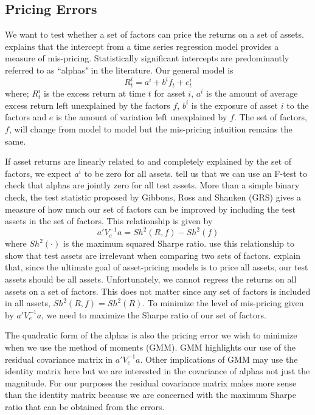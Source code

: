 
\subsection{Pricing Errors}

We want to test whether a set of factors can price the returns on a set of
assets.
\textcite{jensen1968performance} explains that the intercept from a time
series regression model provides a measure of mis-pricing.
Statistically significant intercepts are predominantly referred to as ``alphas"
in the literature. 
Our general model is
\begin{equation}
  \label{eq:gen_reg_model}
  R_t^i = a^i + b^if_t + e_t^i
\end{equation}
where;
$R_t^i$ is the excess return at time $t$ for asset $i$,
$a^i$ is the amount of average excess return left unexplained by the factors $f$,
$b^i$ is the exposure of asset $i$ to the factors and
$e$ is the amount of variation left unexplained by $f$.
The set of factors, $f$, will change from model to model but the mis-pricing
intuition remains the same.

If asset returns are linearly related to and completely explained by the set of factors, we 
expect $a^i$ to be zero for all assets.
\textcite{gibbons1989test} tell us that we can use an F-test to check that
alphas are jointly zero for all test assets.
More than a simple binary check, the test statistic proposed by Gibbons, Ross
and Shanken (GRS) gives a measure of how much our set of factors can be
improved by including the test assets in the set of factors.
This relationship is given by
\[
  a'V_e^{-1}a = Sh^2(R, f) - Sh^2(f)
\]
where $Sh^2(\cdot)$ is the maximum squared Sharpe ratio.
\textcite{barillas2016alpha} use this relationship to show that test assets are
irrelevant when comparing two sets of factors.
\textcite{fama2016choosing} explain that, since the ultimate goal of
asset-pricing models is to price all assets, our test assets should be all
assets.
Unfortunately, we cannot regress the returns on all assets on a set of factors.
This does not matter since any set of factors is included in all assets,
$Sh^2(R, f)=Sh^2(R)$.
To minimize the level of mis-pricing given by $a'V_e^{-1}a$, we need to
maximize the Sharpe ratio of our set of factors.

The quadratic form of the alphas is also the pricing error we wish to minimize when we use the 
method of moments (GMM).
GMM highlights our use of the residual covariance matrix in $a'V_e^{-1}a$.
Other implications of GMM may use the identity matrix here but we are interested in the 
covariance of alphas not just the magnitude.
For our purposes the residual covariance matrix makes more sense than the identity matrix 
because we are concerned with the maximum Sharpe ratio that can be obtained from the errors.
